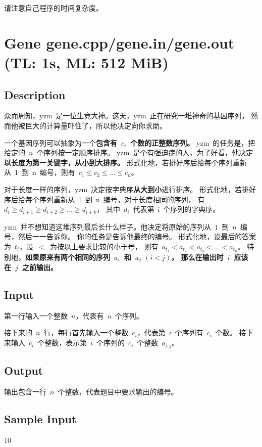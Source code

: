\documentclass[12pt, hyperref, UTF8]{article}
\begin{document}
	请注意自己程序的时间复杂度。

	\newpage
	\section{Gene \small{gene.cpp/gene.in/gene.out
	(TL: 1s, ML: 512 MiB)}}

	\subsection{Description}
	众而周知，yzm~是一位生竞大神。这天，yzm~正在研究一堆神奇的基因序列，
	然而他被巨大的计算量吓住了，所以他决定向你求助。

	一个基因序列可以抽象为一个\textbf{包含有~$c_i$~个数的正整数序列。}
	yzm~的任务是，把给定的~$n$~个序列按一定顺序排序。
	yzm~是个有强迫症的人，为了好看，他决定\textbf{以长度为第一关键字，从小到大排序。}
	形式化地，若排好序后给每个序列重新从~1~到~n~编号，则有~$c_1 \le c_2 \le ... \le c_n$。

	对于长度一样的序列，yzm~决定按字典序\textbf{从大到小}进行排序。
	形式化地，若排好序后给每个序列重新从~1~到~n~编号，对于长度相同的序列，
	有~$d_{i} \ge d_{i + 1} \ge d_{i + 2} \ge ... \ge d_{i + k}$，
	其中~$d_i$~代表第~i~个序列的字典序。

	yzm~并不想知道这堆序列最后长什么样子。他决定将原始的序列从~$1$~到~$n$~编号，然后一一告诉你。
	你的任务是告诉他最终的编号。
	形式化地，设最后的答案为~$t_i$，设~$<$~为按以上要求比较的小于号，
	则有~$a_{t_1} < a_{t_2} < a_{t_3} < ... < a_{t_n}$。
	特别地，\textbf{如果原来有两个相同的序列~$a_i$~和~$a_j$ $(i < j)$，
	那么在输出时~$i$~应该在~$j$~之前输出。}

	\subsection{Input}
	第一行输入一个整数~$n$，代表有~$n$~个序列。

	接下来的~$n$~行，每行首先输入一个整数~$c_i$，代表第~$i$~个序列有~$c_i$~个数。
	接下来输入~$c_i$~个整数，表示第~$i$~个序列的~$c_i$~个整数~$a_{i, j}$。

	\subsection{Output}
	输出包含一行~$n$~个整数，代表题目中要求输出的编号。
	
	\newpage
	\subsection{Sample Input}
	10
\end{document}
